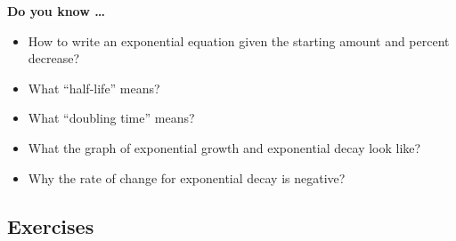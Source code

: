 
 

\noindent \textbf{Do you know \ldots}

\begin{itemize}
\item How to write an exponential equation given the starting amount and percent decrease? 
\item What ``half-life'' means? 
\item What ``doubling time'' means?     
\item What the graph of exponential growth and exponential decay look like? 
\item Why the rate of change for exponential decay is negative? 
  
\end{itemize}

\subsection*{Exercises}

